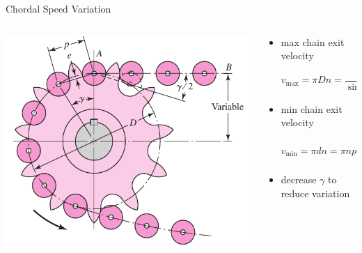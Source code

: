 \documentclass[10pt, svgnames]{beamer}
\begin{document}
\begin{frame}[label={sec:org65bf7b7}]{Chordal Speed Variation}
\begin{columns}
\begin{column}{0.5\columnwidth}
\begin{center}
\includegraphics[height=\textwidth]{./pictures/chordal-speed-variation.png}
\end{center}
\end{column}

\begin{column}{0.5\columnwidth}
\begin{itemize}
\item max chain exit velocity

$$ v_{\max} = \pi D n = \frac{\pi n p}{\sin (\gamma/2)} $$

\item min chain exit velocity

$$ v_{\min} = \pi d n = \pi n p \frac{\cos(\gamma/2)}{\sin (\gamma/2)}$$

\item decrease \(\gamma\) to reduce variation
\end{itemize}
\end{column}
\end{columns}
\end{frame}
\end{document}
